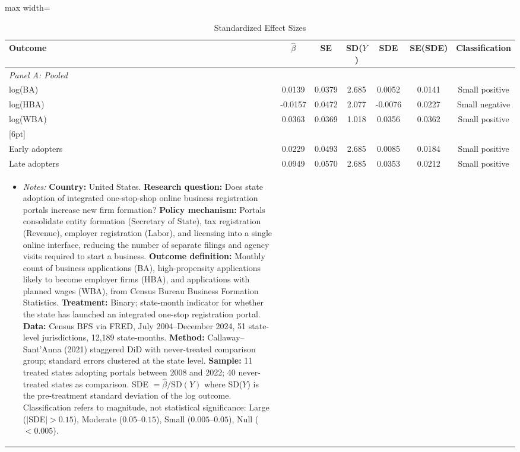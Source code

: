 \begin{table}[htbp]
\centering
\caption{Standardized Effect Sizes}
\label{tab:sde}
\begin{adjustbox}{max width=\textwidth}
\begin{tabular}{lcccccc}
\hline\hline
Outcome & $\hat{\beta}$ & SE & SD($Y$) & SDE & SE(SDE) & Classification \\
\hline
\multicolumn{7}{l}{\textit{Panel A: Pooled}} \\
log(BA) & 0.0139 & 0.0379 & 2.685 & 0.0052 & 0.0141 & Small positive \\
log(HBA) & -0.0157 & 0.0472 & 2.077 & -0.0076 & 0.0227 & Small negative \\
log(WBA) & 0.0363 & 0.0369 & 1.018 & 0.0356 & 0.0362 & Small positive \\
{}[6pt]
\multicolumn{7}{l}{\textit{Panel B: Heterogeneous (sample splits)}} \\
Early adopters & 0.0229 & 0.0493 & 2.685 & 0.0085 & 0.0184 & Small positive \\
Late adopters & 0.0949 & 0.0570 & 2.685 & 0.0353 & 0.0212 & Small positive \\
\hline\hline
\begin{minipage}{0.95\textwidth}
\begin{itemize}[leftmargin=*]
\item \textit{Notes:} \textbf{Country:} United States. \textbf{Research question:} Does state adoption of integrated one-stop-shop online business registration portals increase new firm formation? \textbf{Policy mechanism:} Portals consolidate entity formation (Secretary of State), tax registration (Revenue), employer registration (Labor), and licensing into a single online interface, reducing the number of separate filings and agency visits required to start a business. \textbf{Outcome definition:} Monthly count of business applications (BA), high-propensity applications likely to become employer firms (HBA), and applications with planned wages (WBA), from Census Bureau Business Formation Statistics. \textbf{Treatment:} Binary; state-month indicator for whether the state has launched an integrated one-stop registration portal. \textbf{Data:} Census BFS via FRED, July 2004--December 2024, 51 state-level jurisdictions, 12,189 state-months. \textbf{Method:} Callaway--Sant'Anna (2021) staggered DiD with never-treated comparison group; standard errors clustered at the state level. \textbf{Sample:} 11 treated states adopting portals between 2008 and 2022; 40 never-treated states as comparison. SDE $= \hat{\beta} / \text{SD}(Y)$ where SD($Y$) is the pre-treatment standard deviation of the log outcome. Classification refers to magnitude, not statistical significance: Large ($|$SDE$| > 0.15$), Moderate ($0.05$--$0.15$), Small ($0.005$--$0.05$), Null ($< 0.005$).
\end{itemize}
\end{minipage}
\end{tabular}
\end{adjustbox}
\end{table}

